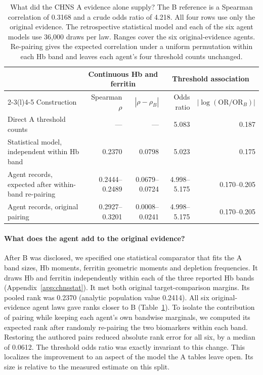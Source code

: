 \documentclass[sigconf,anonymous,review]{acmart}
\begin{document}
\begin{table}[t]
\caption{What did the CHNS A evidence alone supply? The B reference is a Spearman correlation of 0.3168 and a crude odds ratio of 4.218. All four rows use only the original evidence. The retrospective statistical model and each of the six agent models use 36,000 draws per law. Ranges cover the six original-evidence agents. Re-pairing gives the expected correlation under a uniform permutation within each Hb band and leaves each agent's four threshold counts unchanged.}
\label{tab:chnsattribution}
\centering
\begin{tabular}{@{}lrrrr@{}}
\toprule
 & \multicolumn{2}{c}{Continuous Hb and ferritin} & \multicolumn{2}{c}{Threshold association}\\
\cmidrule(lr){2-3}\cmidrule(l){4-5}
Construction & Spearman $\rho$ & $|\rho-\rho_B|$ & Odds ratio & $|\log(\mathrm{OR}/\mathrm{OR}_B)|$\\
\midrule
Direct A threshold counts & --- & --- & 5.083 & 0.187\\
Statistical model, independent within Hb band & 0.2370 & 0.0798 & 5.023 & 0.175\\
Agent records, expected after within-band re-pairing & 0.2444--0.2489 & 0.0679--0.0724 & 4.998--5.175 & 0.170--0.205\\
Agent records, original pairing & 0.2927--0.3201 & 0.0008--0.0241 & 4.998--5.175 & 0.170--0.205\\
\bottomrule
\end{tabular}
\end{table}

\paragraph{What does the agent add to the original evidence?}
After B was disclosed, we specified one statistical comparator that fits the A band sizes, Hb moments, ferritin geometric moments and depletion frequencies. It draws Hb and ferritin independently within each of the three reported Hb bands (Appendix~\ref{app:chnsstat}). It met both original target-comparison margins. Its pooled rank was 0.2370 (analytic population value 0.2414). All six original-evidence agent laws gave ranks closer to B (Table~\ref{tab:chnsattribution}). To isolate the contribution of pairing while keeping each agent's own bandwise marginals, we computed its expected rank after randomly re-pairing the two biomarkers within each band. Restoring the authored pairs reduced absolute rank error for all six, by a median of 0.0612. The threshold odds ratio was exactly invariant to this change. This localizes the improvement to an aspect of the model the A tables leave open. Its size is relative to the measured estimate on this split.
\end{document}
